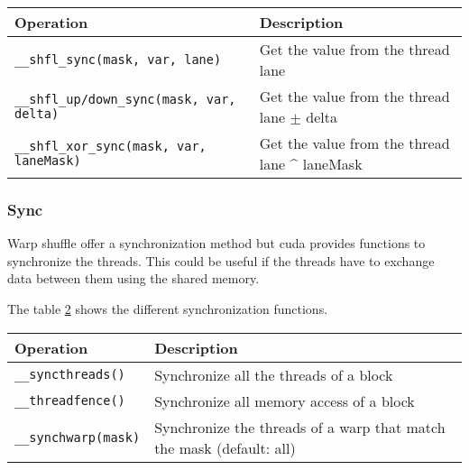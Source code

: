 \begin{table}[ht]
    \centering
    \begin{tabular}{|l|l|}
        \hline
        \textbf{Operation} & \textbf{Description} \\
        \hline
        \texttt{\_\_shfl\_sync(mask, var, lane)} & Get the value from the thread lane\\
        \hline
        \texttt{\_\_shfl\_up/down\_sync(mask, var, delta)} & Get the value from the thread lane $\pm$ delta\\
        \hline
        \texttt{\_\_shfl\_xor\_sync(mask, var, laneMask)} & Get the value from the thread lane \^{} laneMask\\
        \hline
    \end{tabular}
    \label{tab:analyze:cuda:synchronization:warp-shuffle}
\end{table}


\subsubsection{Sync}
\label{ch:analyze:cuda:synchronization:sync}

Warp shuffle offer a synchronization method but \acrshort{cuda} provides
functions to synchronize the threads.
This could be useful if the threads have to exchange data between them using
the shared memory.

The table \ref{tab:analyze:cuda:synchronization:sync} shows the different
synchronization functions.

\begin{table}[ht]
    \centering
    \begin{tabular}{|l|l|}
        \hline
        \textbf{Operation} & \textbf{Description} \\
        \hline
        \texttt{\_\_syncthreads()} & Synchronize all the threads of a block\\
        \hline
        \texttt{\_\_threadfence()} & Synchronize all memory access of a block\\
        \hline
        \texttt{\_\_synchwarp(mask)} & Synchronize the threads of a warp that match the mask (default: all)\\
        \hline
    \end{tabular}
    \label{tab:analyze:cuda:synchronization:sync}
\end{table}



